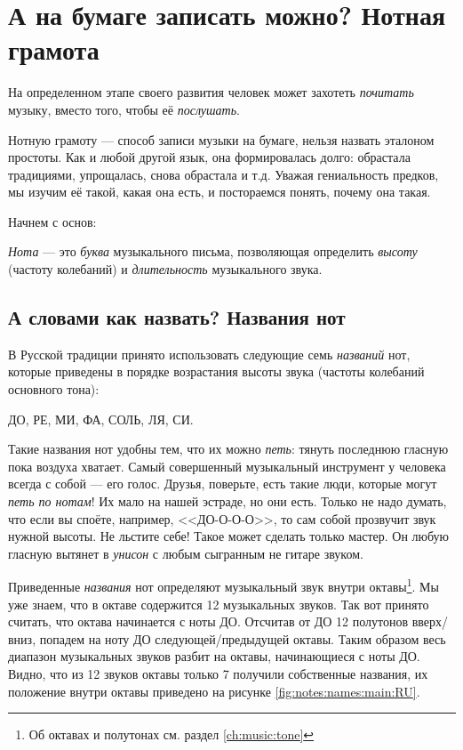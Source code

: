 \chapter{А на бумаге записать можно? Нотная грамота}
\label{ch:notes}

На определенном этапе своего развития человек может захотеть \emph{почитать} музыку, вместо того, чтобы её \emph{послушать}.

Нотную грамоту --- способ записи музыки на бумаге, нельзя назвать эталоном простоты. Как и любой другой язык, она формировалась долго: обрастала традициями, упрощалась, снова обрастала и т.д. Уважая гениальность предков, мы изучим её такой, какая она есть, и постораемся понять, почему она такая.

Начнем с основ:

\begin{Definition}[Нота]
    \emph{Нота} --- это \emph{буква} музыкального письма, позволяющая определить \emph{высоту} (частоту колебаний) и \emph{длительность} музыкального звука. 
\end{Definition}


\section{А словами как назвать? Названия нот}
\label{ch:notes:names}

В Русской традиции принято использовать следующие семь \emph{названий} нот, которые приведены в порядке возрастания высоты звука (частоты колебаний основного тона): 
\begin{center}
    ДО, РЕ, МИ, ФА, СОЛЬ, ЛЯ, СИ.
\end{center}

Такие названия нот удобны тем, что их можно \emph{петь}: тянуть последнюю гласную пока воздуха хватает. Самый совершенный музыкальный инструмент у человека всегда с собой --- его голос. Друзья, поверьте, есть такие люди, которые могут \emph{петь по нотам}! Их мало на нашей эстраде, но они есть. Только не надо думать, что если вы споёте, например, <<ДО-О-О-О>>, то сам собой прозвучит звук нужной высоты. Не льстите себе! Такое может сделать только мастер. Он любую гласную вытянет в \emph{унисон} с любым сыгранным не гитаре звуком.

Приведенные \emph{названия} нот определяют музыкальный звук внутри октавы\footnote{Об октавах и полутонах см. раздел \ref{ch:music:tone}}. Мы уже знаем, что в октаве содержится 12 музыкальных звуков. Так вот принято считать, что октава начинается с ноты ДО. Отсчитав от ДО 12 полутонов вверх/вниз, попадем на ноту ДО следующей/предыдущей октавы. Таким образом весь диапазон музыкальных звуков разбит на октавы, начинающиеся с ноты ДО. Видно, что из 12 звуков октавы только 7 получили собственные названия, их положение внутри октавы приведено на рисунке \ref{fig:notes:names:main:RU}.

